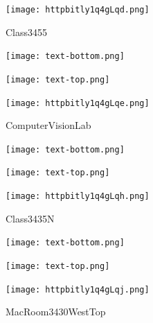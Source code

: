 \documentclass[letterpaper]{article}
\begin{document}
 \begingroup 
 \centerline{\texttt{[image: httpbitly1q4gLqd.png]}} 
 \endgroup 
 \vspace*{\fill} 

 \hfill{\small Class3455} 

  \vspace{0.7in} 
 
 \centerline{\texttt{[image: text-bottom.png]}} 
 
 \pagebreak 
{} 
 \vspace*{\fill} 
 
  \centerline{\texttt{[image: text-top.png]}} 
 
 \vspace{0.5in} 
 
 \begingroup 
 \centerline{\texttt{[image: httpbitly1q4gLqe.png]}} 
 \endgroup 
 \vspace*{\fill} 

 \hfill{\small ComputerVisionLab} 

  \vspace{0.7in} 
 
 \centerline{\texttt{[image: text-bottom.png]}} 
 
 \pagebreak 
{} 
 \vspace*{\fill} 
 
  \centerline{\texttt{[image: text-top.png]}} 
 
 \vspace{0.5in} 
 
 \begingroup 
 \centerline{\texttt{[image: httpbitly1q4gLqh.png]}} 
 \endgroup 
 \vspace*{\fill} 

 \hfill{\small Class3435N} 

  \vspace{0.7in} 
 
 \centerline{\texttt{[image: text-bottom.png]}} 
 
 \pagebreak 
{} 
 \vspace*{\fill} 
 
  \centerline{\texttt{[image: text-top.png]}} 
 
 \vspace{0.5in} 
 
 \begingroup 
 \centerline{\texttt{[image: httpbitly1q4gLqj.png]}} 
 \endgroup 
 \vspace*{\fill} 

 \hfill{\small MacRoom3430WestTop} 

  \vspace{0.7in} 
 
\end{document}
